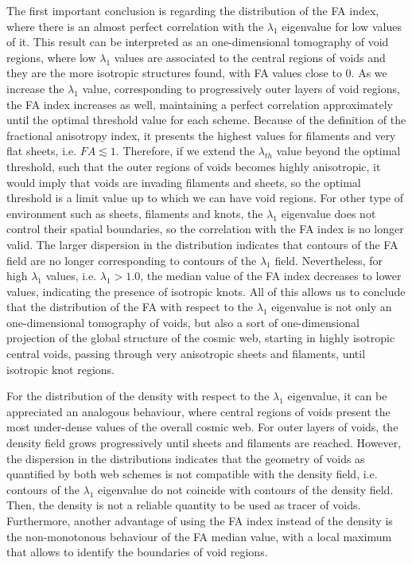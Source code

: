 \documentclass[a4,useAMS,usenatbib,usegraphicx]{latex/mn2e}
\begin{document}
The first important conclusion is regarding the distribution of the FA 
index, where there is an almost perfect correlation with the $\lambda_1$ 
eigenvalue for low values of it. This result can be interpreted as an 
one-dimensional tomography of void regions, where low $\lambda_1$ values 
are associated to the central regions of voids and they are the more 
isotropic structures found, with FA values close to 0. As we increase the 
$\lambda_1$ value, corresponding to progressively outer layers of void 
regions, the FA index increases as well, maintaining a perfect correlation 
approximately until the optimal threshold value for each scheme. Because 
of the definition of the fractional anisotropy index, it presents the 
highest values for filaments and very flat sheets, i.e. $FA\lesssim 1$. 
Therefore, if we extend the $\lambda_{th}$ value beyond the optimal 
threshold, such that the outer regions of voids becomes highly anisotropic, 
it would imply that voids are invading filaments and sheets, so the optimal
threshold is a limit value up to which we can have void regions. For other
type of environment such as sheets, filaments and knots, the $\lambda_1$
eigenvalue does not control their spatial boundaries, so the correlation
with the FA index is no longer valid. The larger dispersion in the 
distribution indicates that contours of the FA field are no longer 
corresponding to contours of the $\lambda_1$ field. Nevertheless, for high
$\lambda_1$ values, i.e. $\lambda_1>1.0$, the median value of the FA index
decreases to lower values, indicating the presence of isotropic knots. All
of this allows us to conclude that the distribution of the FA with respect
to the $\lambda_1$ eigenvalue is not only an one-dimensional tomography of 
voids, but also a sort of one-dimensional projection of the global 
structure of the cosmic web, starting in highly isotropic central voids, 
passing through very anisotropic sheets and filaments, until isotropic 
knot regions.


For the distribution of the density with respect to the $\lambda_1$ 
eigenvalue, it can be appreciated an analogous behaviour, where central 
regions of voids present the most under-dense values of the overall cosmic 
web. For outer layers of voids, the density field grows progressively 
until sheets and filaments are reached. However, the dispersion in the 
distributions indicates that the geometry of voids as quantified by both 
web schemes is not compatible with the density field, i.e. contours of the
$\lambda_1$ eigenvalue do not coincide with contours of the density field. 
Then, the density is not a reliable quantity to be used as tracer of voids. 
Furthermore, another advantage of using the FA index instead of the 
density is the non-monotonous behaviour of the FA median value, with a 
local maximum that allows to identify the boundaries of void regions.
\end{document}
